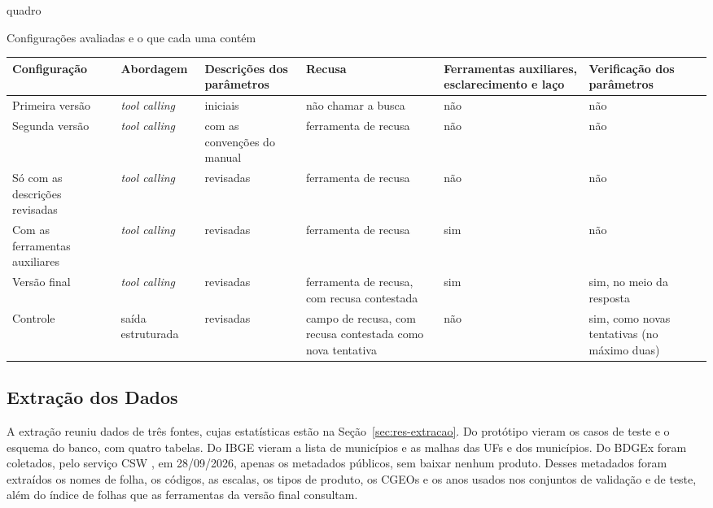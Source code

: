 \begin{fixo}{quadro}
\centering
\caption{Configurações avaliadas e o que cada uma contém}
\label{quadro:configuracoes}
\footnotesize
\setlength{\tabcolsep}{2.5pt}
\begin{tabular}{|>{\raggedright\arraybackslash}p{2.5cm}|>{\raggedright\arraybackslash}p{2.2cm}|>{\raggedright\arraybackslash}p{2.3cm}|>{\raggedright\arraybackslash}p{2.8cm}|>{\raggedright\arraybackslash}p{2.3cm}|>{\raggedright\arraybackslash}p{2.5cm}|}
\hline
\textbf{Configuração} & \textbf{Abordagem} & \textbf{Descrições dos parâmetros} & \textbf{Recusa} & \textbf{Ferramentas auxiliares, esclarecimento e laço} & \textbf{Verificação dos parâmetros} \\ \hline
Primeira versão & \textit{tool calling} & iniciais & não chamar a busca & não & não \\ \hline
Segunda versão & \textit{tool calling} & com as convenções do manual & ferramenta de recusa & não & não \\ \hline
Só com as descrições revisadas & \textit{tool calling} & revisadas & ferramenta de recusa & não & não \\ \hline
Com as ferramentas auxiliares & \textit{tool calling} & revisadas & ferramenta de recusa & sim & não \\ \hline
Versão final & \textit{tool calling} & revisadas & ferramenta de recusa, com recusa contestada & sim & sim, no meio da resposta \\ \hline
Controle & saída estruturada & revisadas & campo de recusa, com recusa contestada como nova tentativa & não & sim, como novas tentativas (no máximo duas) \\ \hline
\end{tabular}
\end{fixo}

\subsection{Extração dos Dados}
\label{sec:extracao}

A extração reuniu dados de três fontes, cujas estatísticas estão na Seção~\ref{sec:res-extracao}. Do protótipo \cite{cgeo2025prototipo} vieram os  casos de teste e o esquema do banco, com quatro tabelas. Do IBGE vieram a lista de municípios e as malhas das UFs e dos municípios. Do BDGEx foram coletados, pelo serviço CSW \cite{ogccsw2007}, em 28/09/2026, apenas os metadados públicos, sem baixar nenhum produto. Desses metadados foram extraídos os nomes de folha, os códigos, as escalas, os tipos de produto, os CGEOs e os anos usados nos conjuntos de validação e de teste, além do índice de folhas que as ferramentas da versão final consultam.

